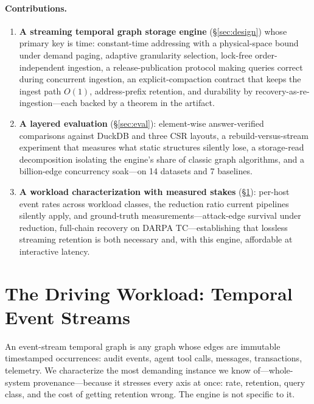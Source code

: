 \documentclass[11pt,letterpaper,twocolumn]{article}
\begin{document}
\paragraph{Contributions.}
\begin{enumerate}[leftmargin=1.2em]
\item \textbf{A streaming temporal graph storage engine}
  (\S\ref{sec:design}) whose primary key is time: constant-time
  addressing with a physical-space bound under demand paging, adaptive
  granularity selection, lock-free order-independent ingestion, a
  release-publication protocol making queries correct during
  concurrent ingestion, an explicit-compaction contract that keeps the
  ingest path $O(1)$, address-prefix retention, and durability by
  recovery-as-re-ingestion---each backed by a theorem in the artifact.
\item \textbf{A layered evaluation} (\S\ref{sec:eval}): element-wise
  answer-verified comparisons against DuckDB and three CSR layouts, a
  rebuild-versus-stream experiment that measures what static
  structures silently lose, a storage-read decomposition isolating the
  engine's share of classic graph algorithms, and a billion-edge
  concurrency soak---on 14 datasets and 7 baselines.
\item \textbf{A workload characterization with measured stakes}
  (\S\ref{sec:workload}): per-host event rates across workload
  classes, the reduction ratio current pipelines silently apply, and
  ground-truth measurements---attack-edge survival under reduction,
  full-chain recovery on DARPA TC---establishing that lossless
  streaming retention is both necessary and, with this engine,
  affordable at interactive latency.
\end{enumerate}

\section{The Driving Workload: Temporal Event Streams}
\label{sec:workload}

An event-stream temporal graph is any graph whose edges are immutable
timestamped occurrences: audit events, agent tool calls, messages,
transactions, telemetry. We characterize the most demanding instance
we know of---whole-system provenance---because it stresses every axis
at once: rate, retention, query class, and the cost of getting
retention wrong. The engine is not specific to it.
\end{document}
